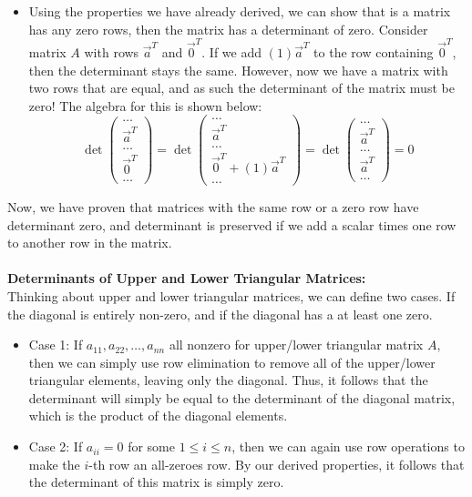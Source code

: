 \documentclass[12pt]{amsart}
\begin{document}
\begin{itemize}
	\item Using the properties we have already derived, we can  show that is a matrix has any zero rows, then the matrix has a determinant of zero. Consider matrix $A$ with rows $\vec{a}^T$ and $\vec{0}^T$. If we add $(1)\vec{a}^T$ to the row containing $\vec{0}^T$, then the determinant stays the same. However, now we have a matrix with two rows that are equal, and as such the determinant of the matrix must be zero! The algebra for this is shown below:
	\[\det \begin{pmatrix}\dots\\\vec{a}^T\\\dots\\\vec{0}^T\\\dots\end{pmatrix} =
	  \det \begin{pmatrix}\dots\\\vec{a}^T\\\dots\\\vec{0}^T + (1)\vec{a}^T\\\dots\end{pmatrix} = 
	  \det \begin{pmatrix}\dots\\\vec{a}^T\\\dots\\\vec{a}^T\\\dots\end{pmatrix} = 0
	\]
\end{itemize}
Now, we have proven that matrices with the same row or a zero row have determinant zero, and determinant is preserved if we add a scalar times one row to another row in the matrix.\\
\\
\textbf{Determinants of Upper and Lower Triangular Matrices:}\\
Thinking about upper and lower triangular matrices, we can define two cases. If the diagonal is entirely non-zero, and if the diagonal has a at least one zero.
\begin{itemize}
	\item Case 1: If $a_{11}, a_{22}, \dots , a_{nn}$ all nonzero for upper/lower triangular matrix $A$, then we can simply use row elimination to remove all of the upper/lower triangular elements, leaving only the diagonal. Thus, it follows that the determinant will simply be equal to the determinant of the diagonal matrix, which is the product of the diagonal elements.
	\item Case 2: If $a_{ii} = 0$ for some $1 \leq i \leq n$, then we can again use row operations to make the $i$-th row an all-zeroes row. By our derived properties, it follows that the determinant of this matrix is simply zero.
\end{itemize}
\end{document}
